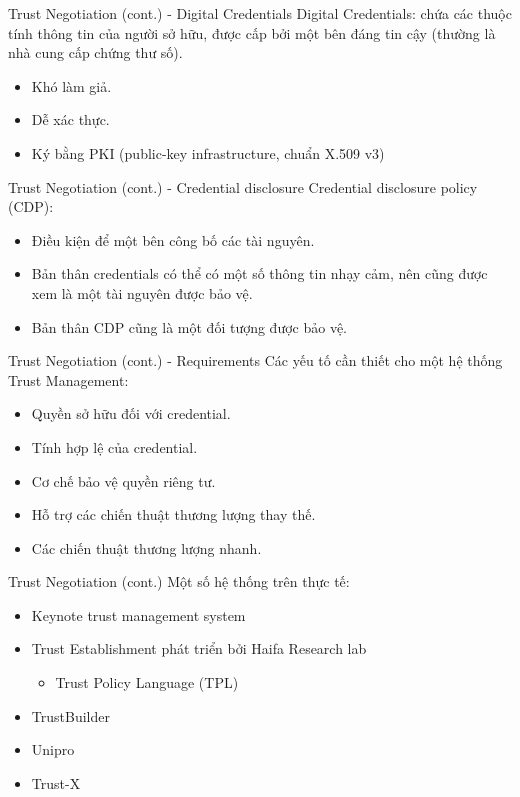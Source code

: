 \documentclass[11pt]{beamer}
\newcommand{\eg}{\text{e.g.\ }}
\begin{document}
\begin{frame}{Trust Negotiation (cont.) - Digital Credentials}
Digital Credentials: chứa các thuộc tính thông tin của người sở hữu, được cấp bởi một bên đáng tin cậy (thường là nhà cung cấp chứng thư số).
\begin{itemize}
\item Khó làm giả.
\item Dễ xác thực.
\item Ký bằng PKI (public-key infrastructure, \eg chuẩn X.509 v3)
\end{itemize}
\end{frame}

\begin{frame}{Trust Negotiation (cont.) - Credential disclosure}
Credential disclosure policy (CDP):
\begin{itemize}
\item Điều kiện để một bên công bố các tài nguyên.
\item Bản thân credentials có thể có một số thông tin nhạy cảm, nên cũng được xem là một tài nguyên được bảo vệ.
\item Bản thân CDP cũng là một đối tượng được bảo vệ.
\end{itemize}
\end{frame}

\begin{frame}{Trust Negotiation (cont.) - Requirements}
Các yếu tố cần thiết cho một hệ thống Trust Management:
\begin{itemize}
\item Quyền sở hữu đối với credential.
\item Tính hợp lệ của credential.
\item Cơ chế bảo vệ quyền riêng tư.
\item Hỗ trợ các chiến thuật thương lượng thay thế.
\item Các chiến thuật thương lượng nhanh.
\end{itemize}
\end{frame}

\begin{frame}{Trust Negotiation (cont.)}
Một số hệ thống trên thực tế:
\begin{itemize}
\item Keynote trust management system
\item Trust Establishment phát triển bởi Haifa Research lab
\begin{itemize}
\item Trust Policy Language (TPL)\cite{848442}
\end{itemize}
\item TrustBuilder
\item Unipro
\item Trust-X
\end{itemize}
\end{frame}
\end{document}
